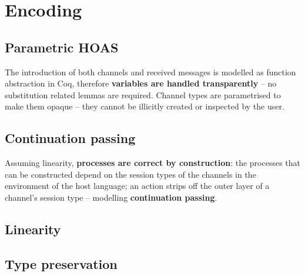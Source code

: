 \documentclass{mproj}
\begin{document}
\chapter{Encoding}\label{encoding}

\section{Parametric HOAS}\label{phoas}


The introduction of both channels and received messages is modelled as function
abstraction in Coq, therefore \textbf{variables are handled transparently} -- no
substitution related lemmas are required. Channel types are parametrised to make
them opaque -- they cannot be illicitly created or inspected by the user.

\section{Continuation passing}\label{continuation-passing}


Assuming linearity, \textbf{processes are correct by construction}: the
processes that can be constructed depend on the session types of the channels in
the environment of the host language; an action strips off the outer layer of a
channel's session type -- modelling \textbf{continuation passing}.

\section{Linearity}\label{linearity}

\section{Type preservation}\label{type-preservation}
\end{document}
